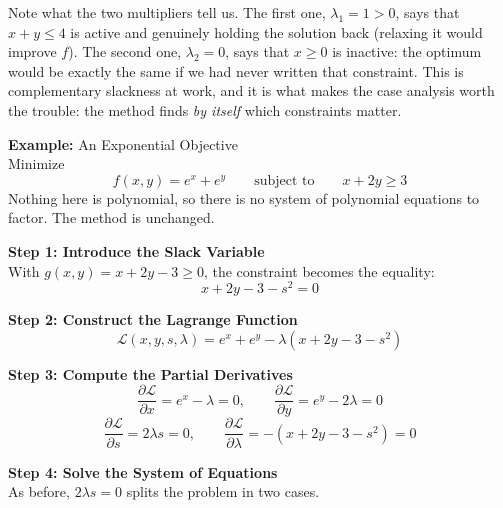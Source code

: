\documentclass[]{article}
\begin{document}
	Note what the two multipliers tell us.
	The first one, $\lambda_1 = 1 > 0$, says that $x + y \leq 4$ is active and genuinely holding the solution back (relaxing it would improve $f$).
	The second one, $\lambda_2 = 0$, says that $x \geq 0$ is inactive: the optimum would be exactly the same if we had never written that constraint.
	This is complementary slackness at work, and it is what makes the case analysis worth the trouble: the method finds \textit{by itself} which constraints matter.

	\vspace{1cm}
	\textbf{Example:}
	An Exponential Objective\\
	Minimize
	$$
	f(x, y) = e^{x} + e^{y}
	\qquad \text{subject to} \qquad
	x + 2y \geq 3
	$$
	Nothing here is polynomial, so there is no system of polynomial equations to factor.
	The method is unchanged.

	\textbf{Step 1: Introduce the Slack Variable}\\
	With $g(x, y) = x + 2y - 3 \geq 0$, the constraint becomes the equality:
	$$
	x + 2y - 3 - s^2 = 0
	$$

	\textbf{Step 2: Construct the Lagrange Function}\\
	$$
	\mathcal{L}(x, y, s, \lambda) = e^{x} + e^{y} - \lambda \left( x + 2y - 3 - s^2 \right)
	$$

	\textbf{Step 3: Compute the Partial Derivatives}\\
	$$
	\frac{\partial \mathcal{L}}{\partial x} = e^{x} - \lambda = 0,
	\qquad
	\frac{\partial \mathcal{L}}{\partial y} = e^{y} - 2 \lambda = 0
	$$
	$$
	\frac{\partial \mathcal{L}}{\partial s} = 2 \lambda s = 0,
	\qquad
	\frac{\partial \mathcal{L}}{\partial \lambda} = -\left( x + 2y - 3 - s^2 \right) = 0
	$$

	\textbf{Step 4: Solve the System of Equations}\\
	As before, $2 \lambda s = 0$ splits the problem in two cases.
\end{document}
